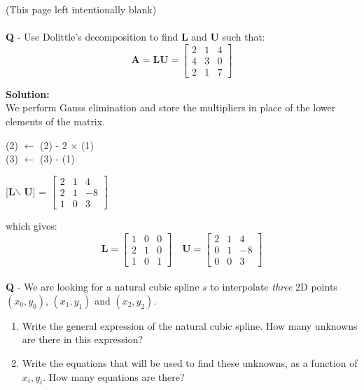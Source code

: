 \documentclass{llncs}
\newcounter{ques}
\renewcommand{\question}[1]{\paragraph{}\textbf{Q\theques} - #1\stepcounter{ques} }
\newcommand{\answer}[1]{\color{red}\textbf{Solution:}\\#1\color{black}}
\begin{document}
\newpage
(This page left intentionally blank)

\newpage

\question{Use Dolittle's decomposition to find \textbf{L} and \textbf{U} such that: 
$$
\textbf{A}=\textbf{LU} =
\begin{bmatrix}
2 & 1 & 4 \\
4 & 3 & 0 \\
2 & 1 & 7
\end{bmatrix}
$$
}

\answer{
We perform Gauss elimination and store the multipliers in place of the lower elements of the matrix.

\noindent (2) $\leftarrow$ (2) - 2 $\times$ (1) \\
(3) $\leftarrow$ (3) - (1)

[\textbf{L}$\backslash$ \textbf{U}] = 
$
\begin{bmatrix}
2 & 1 & 4 \\
2 & 1 & - 8 \\
1 & 0 & 3
\end{bmatrix}
$

which gives:
$$
\textbf{L} = \begin{bmatrix}
1 & 0 & 0\\
2 & 1 & 0 \\
1 & 0 & 1
\end{bmatrix}
\quad 
\textbf{U} = \begin{bmatrix}
2 & 1 & 4 \\
0 & 1 & -8 \\
0 & 0 & 3
\end{bmatrix}
$$
}

\newpage

\question{We are looking for a natural cubic spline $s$ to interpolate \emph{three} 2D points $(x_0, y_0)$, $(x_1 ,y_1)$ and $(x_2, y_2)$.
\begin{enumerate}
\item Write the general expression of the natural cubic spline. How many unknowns are there in this expression?
\item Write the equations that will be used to find these unknowns, as a function of $x_i, y_i$. How many equations are there?
\end{enumerate}
}
\end{document}
